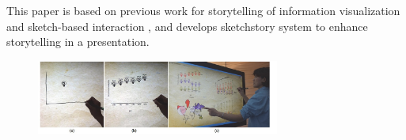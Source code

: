 \documentclass{egpubl}
\begin{document}
This paper is based on previous work for storytelling of information visualization \cite{Gershon2,segal} and sketch-based interaction \cite{li2012}, and develops sketchstory system to enhance storytelling in a presentation.
\begin{figure}
\begingroup
\centering
\includegraphics[width=8cm]{./images/lee2013}
\label{fig:lee2013}
\endgroup
\end{figure}
\end{document}
